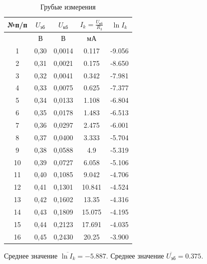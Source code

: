 \begin{center}
\begin{table}[h!]
\centering
\caption{Грубые измерения}
\label{tabl:3}
\begin{tabular}{|c|c|c|c|c|}
\hline
 №п/п &
\begin{minipage}{2cm}
    $U_{\text{эб}}$
\end{minipage} &
\begin{minipage}{2cm}
    $U_{\text{кб}}$
\end{minipage} &
\begin{minipage}{2cm}
    $I_k = \frac{U_{\text{кб}}}{R_3}$
\end{minipage} &
\begin{minipage}{2cm}
    $\ln I_k$
\end{minipage}\\
\hline
{}&В&В&мА&{}\\
\hline
1 & 0,30 & 0,0014 & 0.117 & -9.056 \\
2 & 0,31 & 0,0021 & 0.175 & -8.650 \\
3 & 0,32 & 0,0041 & 0.342 & -7.981 \\
4 & 0,33 & 0,0075 & 0.625 & -7.377 \\
5 & 0,34 & 0,0133 & 1.108 & -6.804 \\
6 & 0,35 & 0,0178 & 1.483 & -6.513 \\
7 & 0,36 & 0,0297 & 2.475 & -6.001 \\
8 & 0,37 & 0,0400 & 3.333 & -5.704 \\
9 & 0,38 & 0,0588 & 4.9 & -5.319 \\
10 & 0,39 & 0,0727 & 6.058 & -5.106 \\
11 & 0,40 & 0,1085 & 9.042 & -4.706 \\
12 & 0,41 & 0,1301 & 10.841 & -4.524 \\
13 & 0,42 & 0,1602 & 13.35 & -4.316 \\
14 & 0,43 & 0,1809 & 15.075 & -4.195 \\
15 & 0,44 & 0,2123 & 17.691 & -4.035 \\
16 & 0,45 & 0,2430 & 20.25 & -3.900 \\
\hline
\end{tabular}
\end{table}
\end{center}
Среднее значение $\overline{\ln I_k} = -5.887$. 
Среднее значение $\overline{U_{\text{эб}}} = 0.375$. 

